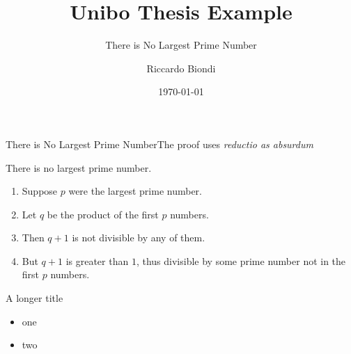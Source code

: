 \documentclass[slidescentered]{beamer}
\title{Unibo Thesis Example}
\subtitle{There is No Largest Prime Number}
\author{Riccardo Biondi}
\date{\today}
\begin{document}
	\begin{frame}[noframenumbering]
		\titlepage
	\end{frame}


	\begin{frame}{There is No Largest Prime Number}{The proof uses \textit{reductio as absurdum}}

		\begin{theorem}
			There is no largest prime number.
		\end{theorem}

		\begin{enumerate}

  		\item<1-| alert@1> Suppose $p$ were the largest prime number.
  		\item<2-> Let $q$ be the product of the first $p$ numbers.
  		\item<3-> Then $q+1$ is not divisible by any of them.
  		\item<1-> But $q + 1$ is greater than $1$, thus divisible by some prime
  		number not in the first $p$ numbers.

		\end{enumerate}

	\end{frame}

	\begin{frame}{A longer title}

		\begin{itemize}
	  	\item one
	  	\item two
		\end{itemize}

	\end{frame}
\end{document}
